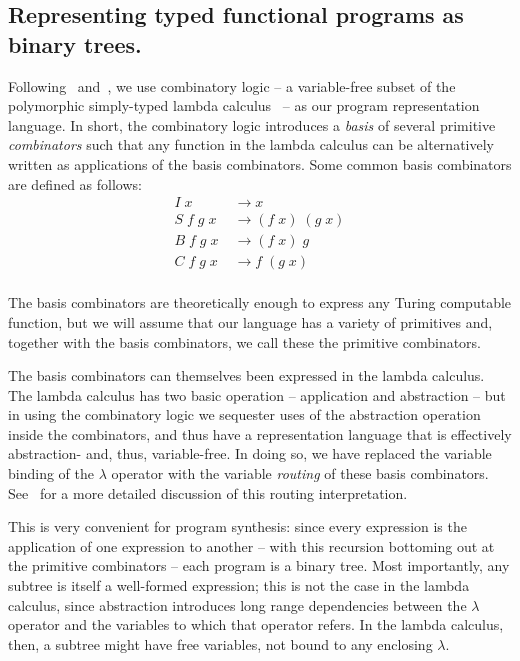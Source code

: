 \documentclass{article}
\begin{document}
\subsection{Representing typed functional programs as binary trees.}

Following~\cite{liang10programs} and~\cite{Briggs:2008}, we use
combinatory logic -- a variable-free subset of the polymorphic
simply-typed lambda calculus~\cite{Pierce_2002} -- as
our program representation language. In short, the combinatory logic
introduces a \emph{basis} of several primitive \emph{combinators} such
that any function in the lambda calculus can be alternatively written
as applications of the basis combinators. Some common basis
combinators are defined as follows:
\begin{align}
I\; x &\rightarrow  x \\
S\; f\; g\; x\; &\rightarrow (f\; x)\; (g\; x) \\ 
B\; f\; g\; x\; &\rightarrow (f\; x)\; g \\ 
C\; f\; g\; x\; &\rightarrow f\; (g\; x) \\ 
\end{align}

The basis
combinators are theoretically enough to express any Turing computable
function, but we will assume that our language has a variety of
primitives and, together with the basis combinators, we call these the
primitive combinators.

The basis combinators can themselves been expressed in the lambda
calculus. The lambda calculus has two basic operation -- application
and abstraction -- but in using the combinatory logic we sequester
uses of the abstraction operation inside the combinators, and thus
have a representation language that is effectively abstraction- and,
thus, variable-free. In doing so, we have replaced the variable
binding of the $\lambda$ operator with the variable \emph{routing} of
these basis combinators. See~\cite{liang10programs} for a more
detailed discussion of this routing interpretation. 

This is very convenient for program synthesis: since every expression
is the application of one expression to another -- with this recursion
bottoming out at the primitive combinators -- each program is a binary
tree. Most importantly, any subtree is itself a well-formed
expression; this is not the case in the lambda calculus, since
abstraction introduces long range dependencies between the $\lambda$
operator and the variables to which that operator refers. In the
lambda calculus, then, a subtree might have free variables, not bound
to any enclosing $\lambda$. 
\end{document}
